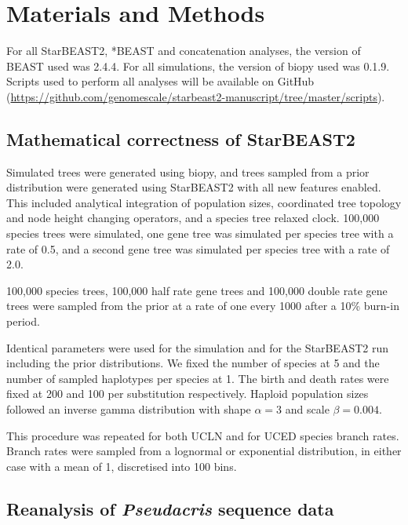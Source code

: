 \documentclass[12pt]{article}
\begin{document}
\section{Materials and Methods}

For all StarBEAST2, *BEAST and concatenation analyses, the version of BEAST
used was 2.4.4. For all simulations, the version of biopy \citep{biopy} used
was 0.1.9. Scripts used to perform all analyses will be available on
GitHub (\url{https://github.com/genomescale/starbeast2-manuscript/tree/master/scripts}).

\subsection{Mathematical correctness of StarBEAST2}

Simulated trees were generated using biopy, and trees sampled from a prior
distribution were generated using StarBEAST2 with all new features enabled.
This included analytical integration of population sizes, coordinated tree
topology and node height changing operators, and a species tree relaxed clock.
100,000 species trees were simulated, one gene tree was simulated per species
tree with a rate of 0.5, and a second gene tree was simulated per species tree
with a rate of 2.0.

100,000 species trees, 100,000 half rate gene trees and 100,000 double rate
gene trees were sampled from the prior at a rate of one every 1000 after a
10\% burn-in period.

Identical parameters were used for the simulation and for the StarBEAST2 run
including the prior distributions. We fixed the number of species at 5 and the
number of sampled haplotypes per species at 1. The birth and death rates were fixed at
200 and 100 per substitution respectively. Haploid population sizes followed
an inverse gamma distribution with shape $\alpha = 3$ and scale $\beta =
0.004$.

This procedure was repeated for both UCLN and for UCED species branch rates.
Branch rates were sampled from a lognormal or exponential distribution, in
either case with a mean of 1, discretised into 100 bins.

\subsection{Reanalysis of \textit{Pseudacris} sequence data}
\end{document}
